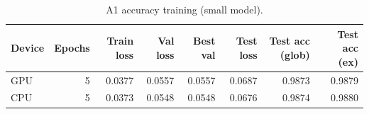 \begin{table}[t]\centering\caption{A1 accuracy training (small model).}
\begin{tabular}{lrrrrrrr}\hline
Device & Epochs & Train loss & Val loss & Best val & Test loss & Test acc (glob) & Test acc (ex) \\\hline
GPU & 5 & 0.0377 & 0.0557 & 0.0557 & 0.0687 & 0.9873 & 0.9879 \\
CPU & 5 & 0.0373 & 0.0548 & 0.0548 & 0.0676 & 0.9874 & 0.9880 \\
\hline\end{tabular}\end{table}
